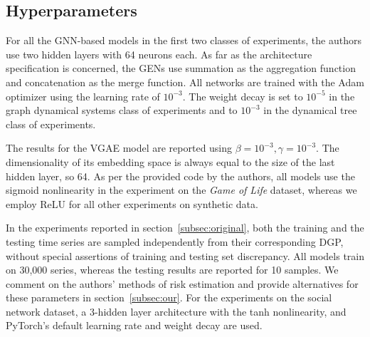 
\subsection{Hyperparameters}
For all the GNN-based models in the first two classes of experiments, the authors use two hidden layers with 64 neurons each. As far as the architecture specification is concerned, the GENs use summation as the aggregation function and concatenation as the merge function. All networks are trained with the Adam optimizer using the learning rate of $10^{-3}$. The weight decay is set to $10^{-5}$ in the graph dynamical systems class of experiments and to $10^{-3}$ in the dynamical tree class of experiments.

The results for the VGAE model are reported using $\beta=10^{-3}, \gamma=10^{-3}$. The dimensionality of its embedding space is always equal to the size of the last hidden layer, so 64. As per the provided code by the authors, all models use the sigmoid nonlinearity in the experiment on the \textit{Game of Life} dataset, whereas we employ ReLU for all other experiments on synthetic data.

In the experiments reported in section~\ref{subsec:original}, both the training and the testing time series are sampled independently from their corresponding DGP, without special assertions of training and testing set discrepancy. 
All models train on 30,000 series, whereas the testing results are reported for 10 samples. We comment on the authors' methods of risk estimation and provide alternatives for these parameters in section~\ref{subsec:our}. For the experiments on the social network dataset, a 3-hidden layer architecture with the tanh nonlinearity, and PyTorch's default learning rate and weight decay are used.


